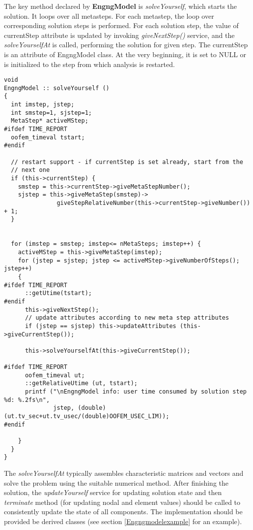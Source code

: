 \documentclass[12pt,draft]{article}
\newcommand{\class}[1]{{\bf #1}}
\newcommand{\service}[1]{{\em #1}}
\begin{document}
The key method declared by \class{EngngModel} is
\service{solveYourself}, which starts the solution. It loops over all
metasteps. For each metastep, the loop over corresponding solution steps is
performed. For each solution step, the value of currentStep attribute
is updated  by invoking \service{giveNextStep()} service, and
the \service{solveYourselfAt} is 
called, performing the solution for given step. The currentStep is
an attribute of EngngModel class. At the very beginning, it is set to
NULL or is initialized to the step from which analysis is restarted.

{\small\begin{verbatim}
void 
EngngModel :: solveYourself ()
{
  int imstep, jstep;
  int smstep=1, sjstep=1;
  MetaStep* activeMStep;
#ifdef TIME_REPORT
  oofem_timeval tstart;
#endif

  // restart support - if currentStep is set already, start from the
  // next one
  if (this->currentStep) {
    smstep = this->currentStep->giveMetaStepNumber();
    sjstep = this->giveMetaStep(smstep)->
               giveStepRelativeNumber(this->currentStep->giveNumber()) + 1;
  }


  for (imstep = smstep; imstep<= nMetaSteps; imstep++) {
    activeMStep = this->giveMetaStep(imstep);
    for (jstep = sjstep; jstep <= activeMStep->giveNumberOfSteps(); jstep++)
    {
#ifdef TIME_REPORT
      ::getUtime(tstart);
#endif
      this->giveNextStep();
      // update attributes according to new meta step attributes
      if (jstep == sjstep) this->updateAttributes (this->giveCurrentStep());
      
      this->solveYourselfAt(this->giveCurrentStep());

#ifdef TIME_REPORT
      oofem_timeval ut;
      ::getRelativeUtime (ut, tstart);
      printf ("\nEngngModel info: user time consumed by solution step %d: %.2fs\n", 
              jstep, (double)(ut.tv_sec+ut.tv_usec/(double)OOFEM_USEC_LIM));
#endif

    }
  }
}
\end{verbatim}}

The \service{solveYourselfAt} typically assembles characteristic matrices and vectors 
and solve the problem using the suitable numerical method. After
finishing the solution,
the \service{updateYourself} service for updating solution state and
then \service{terminate} method (for updating nodal and element
values) should be called to consistently update the state of all
components. The implementation should be provided be derived classes
(see section \ref{Engngmodelexample} for an example).
\end{document}
